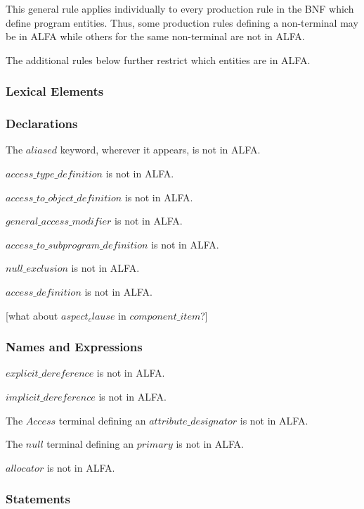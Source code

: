 \documentclass{article}
\newcommand{\bnf}[1]{$\mathit{#1}$}
\begin{document}
This general rule applies individually to every production rule in the BNF
which define program entities. Thus, some production rules defining a
non-terminal may be in ALFA while others for the same non-terminal are not in
ALFA.

The additional rules below further restrict which entities are in ALFA.

\subsubsection{Lexical Elements}


\subsubsection{Declarations}

\noindent
The \bnf{aliased} keyword, wherever it appears, is not in ALFA.


\noindent
\bnf{access\_type\_definition} is not in ALFA.

\noindent
\bnf{access\_to\_object\_definition} is not in ALFA.

\noindent
\bnf{general\_access\_modifier} is not in ALFA.

\noindent
\bnf{access\_to\_subprogram\_definition} is not in ALFA.

\noindent
\bnf{null\_exclusion} is not in ALFA.

\noindent
\bnf{access\_definition} is not in ALFA.

[what about \bnf{aspect_clause} in \bnf{component\_item}?]

\subsubsection{Names and Expressions}

\noindent
\bnf{explicit\_dereference} is not in ALFA.

\noindent
\bnf{implicit\_dereference} is not in ALFA.

\noindent
The \bnf{Access} terminal defining an \bnf{attribute\_designator} is not in
ALFA.

\noindent
The \bnf{null} terminal defining an \bnf{primary} is not in ALFA.

\noindent
\bnf{allocator} is not in ALFA.

\subsubsection{Statements}
\end{document}
